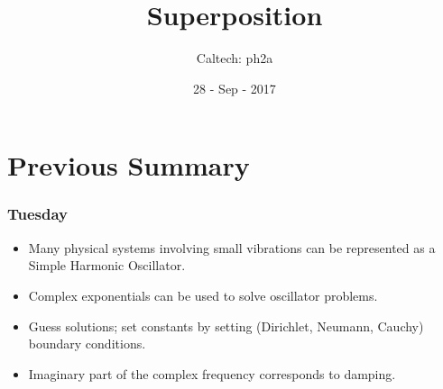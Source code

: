 \documentclass[pdf,hideothersubsections]{beamer}
\begin{document}
\title{Superposition}  
\author{Caltech: ph2a}
\date{28 - Sep - 2017}

\frame{\titlepage} 



\section{Previous Summary}
\begin{frame}
\frametitle{Tuesday}
\begin{itemize}
\item Many physical systems involving small vibrations can be represented as a Simple Harmonic Oscillator.

\item Complex exponentials can be used to solve oscillator problems.

\item Guess solutions; set constants by setting (Dirichlet, Neumann, Cauchy) boundary conditions.

\item Imaginary part of the complex frequency corresponds to damping.
\end{itemize}
\end{frame}
\end{document}
